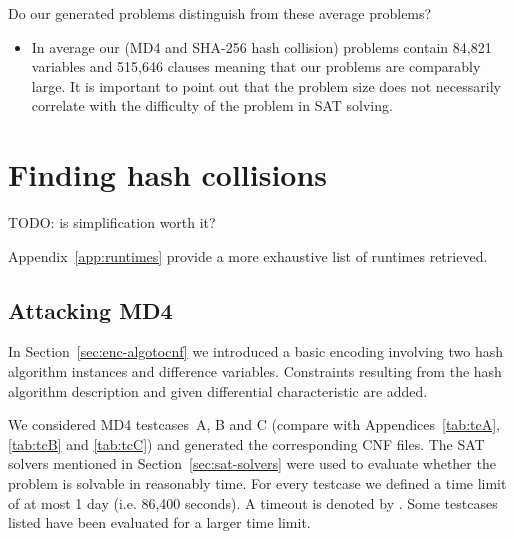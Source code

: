 Do our generated problems distinguish from these average problems?

\begin{itemize}
  \item In average our (MD4 and SHA-256 hash collision) problems contain
        84,821 variables and 515,646 clauses meaning that our problems
        are comparably large. It is important to point out that the
        problem size does not necessarily correlate with the difficulty
        of the problem in SAT solving.
\end{itemize}




\section{Finding hash collisions}
\label{sec:results-attacks}

TODO: is simplification worth it?


Appendix~\ref{app:runtimes} provide a more exhaustive list of runtimes retrieved.

\subsection{Attacking MD4}
\label{sec:results-md4}
%
In Section~\ref{sec:enc-algotocnf} we introduced a basic encoding involving two hash algorithm
instances and difference variables. Constraints resulting from the hash algorithm description
and given differential characteristic are added.

We considered MD4 testcases~A, B and C (compare with Appendices~\ref{tab:tcA}, \ref{tab:tcB} and \ref{tab:tcC})
and generated the corresponding CNF files. The SAT solvers mentioned in Section~\ref{sec:sat-solvers}
were used to evaluate whether the problem is solvable in reasonably time. For every testcase we
defined a time limit of at most 1 day (i.e. 86,400 seconds). A timeout is denoted by \timeout.
Some testcases listed have been evaluated for a larger time limit.

